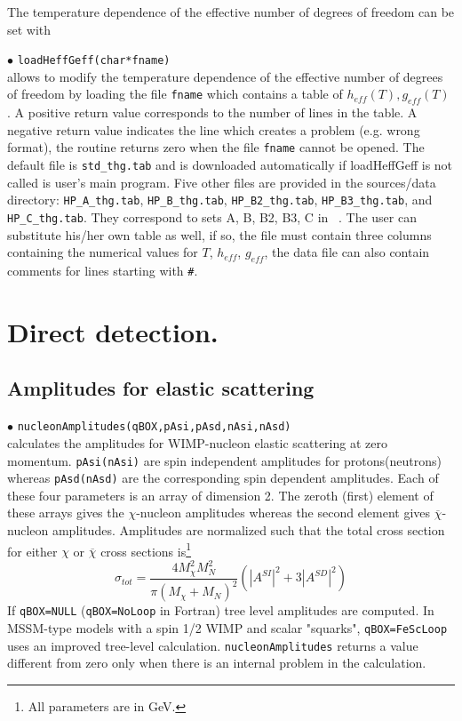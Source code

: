 \documentclass[12pt,a4paper]{article}
\begin{document}
The temperature dependence of the effective number of degrees of freedom can be set with

\noindent$\bullet$ \verb|loadHeffGeff(char*fname)|\\
allows to modify the temperature dependence of the effective number of degrees of freedom
by loading the file \verb|fname| which contains a table of $h_{eff}(T), g_{eff}(T)$ . 
A positive  return value corresponds to the number of lines in the table. A negative return value indicates the line which creates a problem (e.g. wrong format), the routine returns zero when the file \verb|fname| cannot be opened.  The default file is \verb|std_thg.tab| and is downloaded automatically if 
loadHeffGeff is not called is user's main program. Five other files are provided in the sources/data directory:  \verb|HP_A_thg.tab|,  \verb|HP_B_thg.tab|, \verb|HP_B2_thg.tab|,  \verb|HP_B3_thg.tab|,    and \verb|HP_C_thg.tab|. They   correspond to sets A, B, B2, B3, C in ~\cite{Hindmarsh:2005ix}.
The user can substitute his/her own table as well, if so, the file must contain three columns containing the numerical values for $T$, $h_{eff}$, $g_{eff}$, the data file can also contain comments for lines starting with \verb|#|.





\section{Direct detection.}
\subsection{Amplitudes for elastic scattering}
\noindent
 $\bullet$ \verb|nucleonAmplitudes(qBOX,pAsi,pAsd,nAsi,nAsd)|\\
calculates the amplitudes for WIMP-nucleon elastic
scattering at zero momentum. \verb|pAsi(nAsi)| are spin
independent amplitudes for protons(neutrons) whereas
\verb|pAsd(nAsd)| are the corresponding spin dependent amplitudes.
Each of these four parameters is an array of 
dimension 2. The zeroth (first) element of these arrays gives the
$\chi$-nucleon amplitudes whereas the second element gives
$\overline{\chi}$-nucleon amplitudes. Amplitudes are normalized
such that the total cross section for either $\chi$ or $\overline
\chi$ cross sections is\footnote{All parameters are in GeV.}
\begin{equation}
\sigma_{tot}=\frac{4M_{\chi}^2 M_N^2}{\pi(M_{\chi}+M_N)^2}(|A^{SI}|^2+3|A^{SD}|^2)
\label{eq:norm}
\end{equation}
If \verb|qBOX=NULL| (\verb|qBOX=NoLoop| in Fortran) tree level amplitudes are computed. 
In MSSM-type models with a spin 1/2 WIMP and scalar "squarks",   
\verb|qBOX=FeScLoop| uses  an improved tree-level calculation.  
\verb|nucleonAmplitudes| returns a value different from zero only
when there is an internal problem in the calculation.
\end{document}
